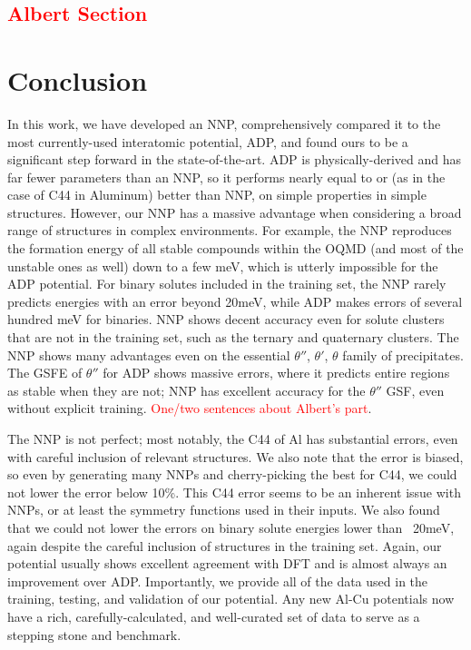 \documentclass{article}
\begin{document}
\textcolor{red}{\subsection{Albert Section}} \label{sct:thetap_theta_transition}

\section{Conclusion}
In this work, we have developed an NNP, comprehensively compared it to the most currently-used interatomic potential, ADP, and found ours to be a significant step forward in the state-of-the-art.
ADP is physically-derived and has far fewer parameters than an NNP, so it performs nearly equal to or (as in the case of C44 in Aluminum) better than NNP, on simple properties in simple structures.
However, our NNP has a massive advantage when considering a broad range of structures in complex environments.
For example, the NNP reproduces the formation energy of all stable compounds within the OQMD (and most of the unstable ones as well) down to a few meV, which is utterly impossible for the ADP potential.
For binary solutes included in the training set, the NNP rarely predicts energies with an error beyond 20meV, while ADP makes errors of several hundred meV for binaries.
NNP shows decent accuracy even for solute clusters that are not in the training set, such as the ternary and quaternary clusters.
The NNP shows many advantages even on the essential $\theta''$, $\theta'$, $\theta$ family of precipitates.
The GSFE of $\theta''$ for ADP shows massive errors, where it predicts entire regions as stable when they are not; NNP has excellent accuracy for the $\theta''$ GSF, even without explicit training.
\textcolor{red}{One/two sentences about Albert's part}.

The NNP is not perfect; most notably, the C44 of Al has substantial errors, even with careful inclusion of relevant structures.
We also note that the error is biased, so even by generating many NNPs and cherry-picking the best for C44, we could not lower the error below 10\%.
This C44 error seems to be an inherent issue with NNPs, or at least the symmetry functions used in their inputs.
We also found that we could not lower the errors on binary solute energies lower than ~20meV, again despite the careful inclusion of structures in the training set.
Again, our potential usually shows excellent agreement with DFT and is almost always an improvement over ADP.
Importantly, we provide all of the data used in the training, testing, and validation of our potential.
Any new Al-Cu potentials now have a rich, carefully-calculated, and well-curated set of data to serve as a stepping stone and benchmark. 
\end{document}
